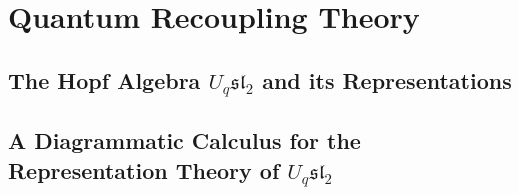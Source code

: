 \newpage
\section{Quantum Recoupling Theory}
\label{sec Quantum Recoupling Theory}


\subsection{The Hopf Algebra $U_q\mathfrak{sl}_2$ and its Representations}
\label{subsec The Hopf Algebra Uqsl2 and its Representations}


\subsection{A Diagrammatic Calculus for the Representation Theory of $U_q\mathfrak{sl}_2$}
\label{subsec A Diagrammatic Calculus for the Representation Theory of Uqsl2}










